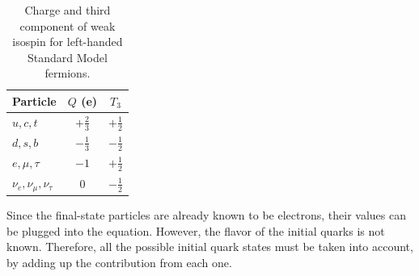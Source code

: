 \begin{table}[htbp]
  \begin{center}
    \caption{Charge and third component of weak isospin for 
      left-handed Standard Model fermions.}
    \label{TableWeakNumbers}
    \begin{tabular}[]{ | l | c | c | }
      \hline
      Particle & $Q$ (e) & $T_3$  \\ \hline \hline
      $u,c,t$ & $+\frac{2}{3}$ & $+\frac{1}{2}$ \\ \hline
      $d,s,b$ & $-\frac{1}{3}$ & $-\frac{1}{2}$ \\ \hline
      $e,\mu,\tau$ & $-1$ & $+\frac{1}{2}$ \\ \hline
      $\nu_e, \nu_{\mu}, \nu_{\tau}$ & $0$ & $-\frac{1}{2}$ \\ \hline
    \end{tabular}
  \end{center}
\end{table}




Since the final-state particles are already known to be electrons, 
their values can be plugged into the equation.  
However, the flavor of the initial quarks is not known.  
Therefore, all the possible initial quark states must 
be taken into account, by adding up the contribution from each one.  









